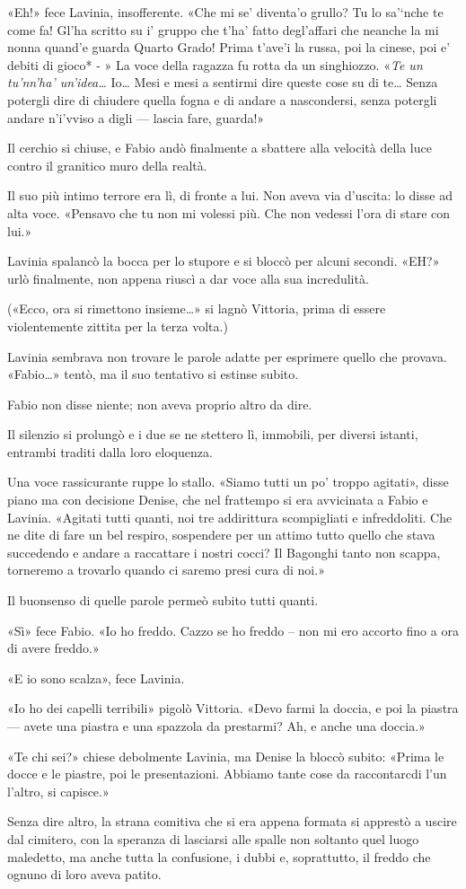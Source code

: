 «Eh!» fece Lavinia, insofferente. «Che
mi se' diventa'o grullo? Tu lo sa'`nche te come fa! Gl'ha scritto su i'
gruppo che t'ha' fatto degl'affari che neanche la mi nonna quand'e
guarda Quarto Grado! Prima t'ave'i la russa, poi la cinese, poi e'
debiti di gioco* - » La voce della ragazza fu rotta da un
singhiozzo. «\emph{Te un tu'nn'ha' un'idea\ldots{}} Io\ldots{}
Mesi e mesi a sentirmi dire queste cose su di te\ldots{} Senza potergli
dire di chiudere quella fogna e di andare a nascondersi, senza potergli
andare n'i'vviso a digli --- lascia fare, guarda!»

Il cerchio si chiuse, e Fabio andò finalmente a sbattere alla velocità
della luce contro il granitico muro della realtà.

Il suo più intimo terrore era lì, di fronte a lui. Non aveva via
d'uscita: lo disse ad alta voce. «Pensavo che tu non mi
volessi più. Che non vedessi l'ora di stare con lui.»

Lavinia spalancò la bocca per lo stupore e si bloccò per alcuni secondi.
«EH?» urlò finalmente, non appena riuscì a dar
voce alla sua incredulità.

(«Ecco, ora si rimettono insieme\ldots{}» si
lagnò Vittoria, prima di essere violentemente zittita per la terza
volta.)

Lavinia sembrava non trovare le parole adatte per esprimere quello che
provava. «Fabio\ldots{}» tentò, ma il suo
tentativo si estinse subito.

Fabio non disse niente; non aveva proprio altro da dire.

Il silenzio si prolungò e i due se ne stettero lì, immobili, per diversi
istanti, entrambi traditi dalla loro eloquenza.

Una voce rassicurante ruppe lo stallo. «Siamo tutti un po'
troppo agitati», disse piano ma con decisione Denise, che
nel frattempo si era avvicinata a Fabio e Lavinia. «Agitati
tutti quanti, noi tre addirittura scompigliati e infreddoliti. Che ne
dite di fare un bel respiro, sospendere per un attimo tutto quello che
stava succedendo e andare a raccattare i nostri cocci? Il Bagonghi tanto
non scappa, torneremo a trovarlo quando ci saremo presi cura di
noi.»

Il buonsenso di quelle parole permeò subito tutti quanti.

«Sì» fece Fabio. «Io ho freddo. Cazzo se ho freddo -- non mi ero
accorto fino a ora di avere freddo.»

«E io sono scalza», fece Lavinia.

«Io ho dei capelli terribili» pigolò Vittoria. «Devo farmi la doccia, e poi la piastra ---
avete una piastra e una spazzola da prestarmi? Ah, e anche una
doccia.»

«Te chi sei?» chiese debolmente Lavinia, ma
Denise la bloccò subito: «Prima le docce e le piastre, poi le
presentazioni. Abbiamo tante cose da raccontarcdi l'un l'altro, si
capisce.»

Senza dire altro, la strana comitiva che si era appena formata si
apprestò a uscire dal cimitero, con la speranza di lasciarsi alle spalle
non soltanto quel luogo maledetto, ma anche tutta la confusione, i dubbi
e, soprattutto, il freddo che ognuno di loro aveva patito.
